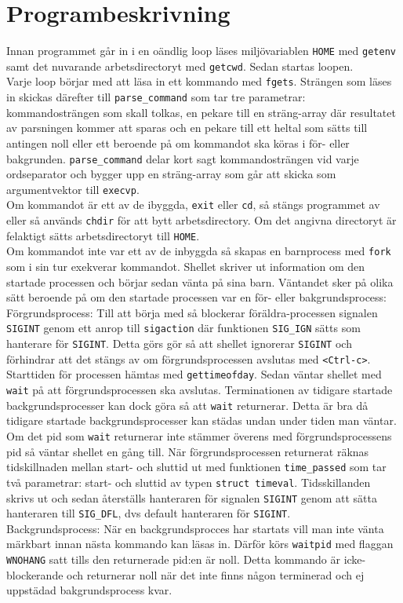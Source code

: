\documentclass[a4paper]{article}
\begin{document}
\section*{Programbeskrivning}
Innan programmet går in i en oändlig loop läses miljövariablen \texttt{HOME} med  \texttt{getenv} samt det nuvarande arbetsdirectoryt med \texttt{getcwd}. Sedan startas loopen.
\\
Varje loop börjar med att läsa in ett kommando med \texttt{fgets}. Strängen som läses in skickas därefter till \texttt{parse\_command} som tar tre parametrar: kommandosträngen som skall tolkas, en pekare till en sträng-array där resultatet av parsningen kommer att sparas och en pekare till ett heltal som sätts till antingen noll eller ett beroende på om kommandot ska köras i för- eller bakgrunden. \texttt{parse\_command} delar kort sagt kommandosträngen vid varje ordseparator och bygger upp en sträng-array som går att skicka som argumentvektor till \texttt{execvp}. 
\\
Om kommandot är ett av de ibyggda, \texttt{exit} eller \texttt{cd}, så stängs programmet av eller så används \texttt{chdir} för att bytt arbetsdirectory. Om det angivna directoryt är felaktigt sätts arbetsdirectoryt till \texttt{HOME}.
\\
Om kommandot inte var ett av de inbyggda så skapas en barnprocess med \texttt{fork} som i sin tur exekverar kommandot. Shellet skriver ut information om den startade processen och börjar sedan vänta på sina barn. Väntandet sker på olika sätt beroende på om den startade processen var en för- eller bakgrundsprocess:
\\
Förgrundsprocess:
Till att börja med så blockerar föräldra-processen signalen \texttt{SIGINT} genom ett anrop till \texttt{sigaction} där funktionen \texttt{SIG\_IGN} sätts som hanterare för \texttt{SIGINT}. Detta görs gör så att shellet ignorerar \texttt{SIGINT} och förhindrar att det stängs av om förgrundsprocessen avslutas med \texttt{<Ctrl-c>}. Starttiden för processen hämtas med \texttt{gettimeofday}. Sedan väntar shellet med  \texttt{wait} på att förgrundsprocessen ska avslutas. Terminationen av tidigare startade backgrundsprocesser kan dock göra så att \texttt{wait} returnerar. Detta är bra då tidigare startade backgrundsprocesser kan städas undan under tiden man väntar. Om det pid som \texttt{wait} returnerar inte stämmer överens med förgrundsprocessens pid så väntar shellet en gång till.
När förgrundsprocessen returnerat räknas tidskillnaden mellan start- och sluttid ut med funktionen \texttt{time\_passed} som tar två parametrar: start- och sluttid av typen \texttt{struct timeval}. Tidsskillanden skrivs ut och sedan återställs hanteraren för signalen \texttt{SIGINT} genom att sätta hanteraren till \texttt{SIG\_DFL}, dvs default hanteraren för \texttt{SIGINT}.
\\
Backgrundsprocess:
När en backgrundsprocces har startats vill man inte vänta märkbart innan nästa kommando kan läsas in. Därför körs \texttt{waitpid} med flaggan \texttt{WNOHANG} satt tills den returnerade pid:en är noll. Detta kommando är icke-blockerande och returnerar noll när det inte finns någon terminerad och ej uppstädad bakgrundsprocess kvar.
 
\end{document}

